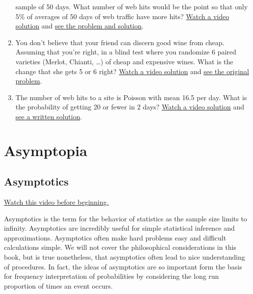 \documentclass[]{article}
\begin{document}
\begin{enumerate}
  sample of 50 days. What number of web hits would be the point so that
  only 5\% of averages of 50 days of web traffic have more hits?
  \href{https://www.youtube.com/watch?v=c_B2AuOhdzg\&index=13\&list=PLpl-gQkQivXhHOcVeU3bSJg78zaDYbP9L}{Watch
  a video solution} and
  \href{http://bcaffo.github.io/courses/06_StatisticalInference/homework/hw2.html\#7}{see
  the problem and solution}.
\item
  You don't believe that your friend can discern good wine from cheap.
  Assuming that you're right, in a blind test where you randomize 6
  paired varieties (Merlot, Chianti, \ldots{}) of cheap and expensive
  wines. What is the change that she gets 5 or 6 right?
  \href{https://www.youtube.com/watch?v=ILm2OUl6p_w\&index=14\&list=PLpl-gQkQivXhHOcVeU3bSJg78zaDYbP9L}{Watch
  a video solution} and
  \href{http://bcaffo.github.io/courses/06_StatisticalInference/homework/hw2.html\#8}{see
  the original problem}.
\item
  The number of web hits to a site is Poisson with mean 16.5 per day.
  What is the probability of getting 20 or fewer in 2 days?
  \href{https://www.youtube.com/watch?v=PMPFbwtpp1k\&index=18\&list=PLpl-gQkQivXhHOcVeU3bSJg78zaDYbP9L}{Watch
  a video solution} and
  \href{http://bcaffo.github.io/courses/06_StatisticalInference/homework/hw2.html\#12}{see
  a written solution}.
\end{enumerate}

\newpage

\section{Asymptopia}\label{asymptopia}

\subsection{Asymptotics}\label{asymptotics}

\href{http://youtu.be/WRUgUEBIYZY?list=PLpl-gQkQivXiBmGyzLrUjzsblmQsLtkzJ}{Watch
this video before beginning.}

Asymptotics is the term for the behavior of statistics as the sample
size limits to infinity. Asymptotics are incredibly useful for simple
statistical inference and approximations. Asymptotics often make hard
problems easy and difficult calculations simple. We will not cover the
philosophical considerations in this book, but is true nonetheless, that
asymptotics often lead to nice understanding of procedures. In fact, the
ideas of asymptotics are so important form the basis for frequency
interpretation of probabilities by considering the long run proportion
of times an event occurs.
\end{document}
